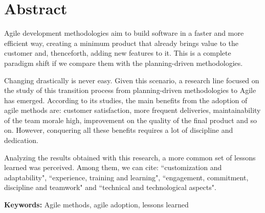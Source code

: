 \chapter*{Abstract}

Agile development methodologies aim to build software in a faster and more efficient way, creating a minimum product that already brings value to the customer and, thenceforth, adding new features to it. This is a complete paradigm shift if we compare them with the planning-driven methodologies.

Changing drastically is never easy. Given this scenario, a research line focused on the study of this transition process from planning-driven methodologies to Agile has emerged. According to its studies, the main benefits from the adoption of agile methods are: customer satisfaction, more frequent deliveries, maintainability of the team morale high, improvement on the quality of the final product and so on. However, conquering all these benefits requires a lot of discipline and dedication.

Analyzing the results obtained with this research, a more common set of lessons learned was perceived. Among them, we can cite: ``customization and adaptability", ``experience, training and learning", ``engagement, commitment, discipline and teamwork" and ``technical and technological aspects".

\textbf{Keywords:} Agile methods, agile adoption, lessons learned
